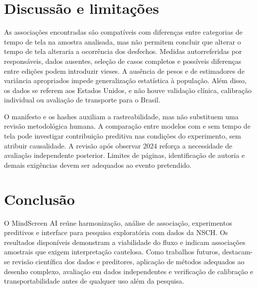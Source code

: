 \documentclass[12pt]{article}
\begin{document}
\section{Discussão e limitações}
As associações encontradas são compatíveis com diferenças entre categorias de tempo de tela na amostra analisada, mas não permitem concluir que alterar o tempo de tela alteraria a ocorrência dos desfechos. Medidas autorreferidas por responsáveis, dados ausentes, seleção de casos completos e possíveis diferenças entre edições podem introduzir vieses. A ausência de pesos e de estimadores de variância apropriados impede generalização estatística à população. Além disso, os dados se referem aos Estados Unidos, e não houve validação clínica, calibração individual ou avaliação de transporte para o Brasil.

O manifesto e os hashes auxiliam a rastreabilidade, mas não substituem uma revisão metodológica humana. A comparação entre modelos com e sem tempo de tela pode investigar contribuição preditiva nas condições do experimento, sem atribuir causalidade. A revisão após observar 2024 reforça a necessidade de avaliação independente posterior. Limites de páginas, identificação de autoria e demais exigências devem ser adequados ao evento pretendido.

\section{Conclusão}
O MindScreen AI reúne harmonização, análise de associação, experimentos preditivos e interface para pesquisa exploratória com dados da NSCH. Os resultados disponíveis demonstram a viabilidade do fluxo e indicam associações amostrais que exigem interpretação cautelosa. Como trabalhos futuros, destacam-se revisão científica dos dados e preditores, aplicação de métodos adequados ao desenho complexo, avaliação em dados independentes e verificação de calibração e transportabilidade antes de qualquer uso além da pesquisa.



\end{document}
